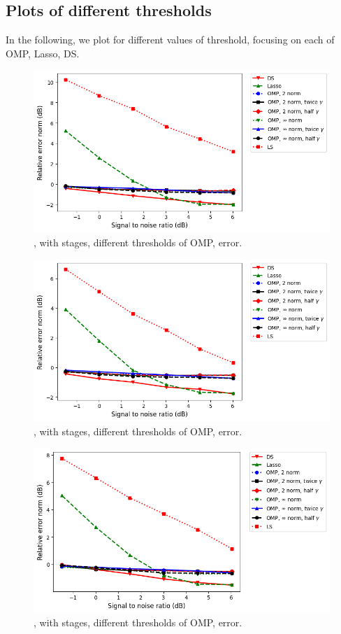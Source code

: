 \subsection {Plots of different thresholds}

In the following, we plot for different values of threshold, focusing on each of OMP, Lasso, DS.
%
\begin {figure} [H]
\includegraphics [width = \textwidth] {error-medium-more-square-six-oommpp.png}
\caption {, with  stages, different thresholds of OMP, error.}
\end {figure}
%
\begin {figure} [H]
\includegraphics [width = \textwidth] {error-medium-more-wide-six-oommpp.png}
\caption {, with  stages, different thresholds of OMP, error.}
\end {figure}
%
\begin {figure} [H]
\includegraphics [width = \textwidth] {error-medium-more-tall-six-oommpp.png}
\caption {, with  stages, different thresholds of OMP, error.}
\end {figure}
